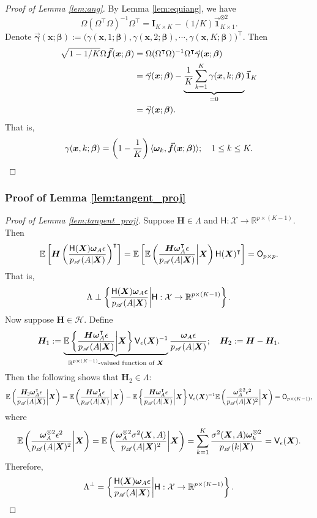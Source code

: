 \documentclass[11pt]{article}
\numberwithin{equation}{section}
\theoremstyle{definition}
\theoremstyle{remark}
\newcommand{\bbf}{\bm{f}}
\newcommand{\bx}{\bm{x}}
\newcommand{\Ib}{\mathbf{I}}
\newcommand{\bH}{\bm{H}}
\newcommand{\bX}{\bm{X}}
\newcommand{\bbeta}{\bm{\beta}}
\newcommand{\bgamma}{\bm{\gamma}}
\newcommand{\bomega}{\bm{\omega}}
\newcommand{\bbE}{\mathbb{E}}
\newcommand{\bbR}{\mathbb{R}}
\newcommand{\cH}{\mathcal{H}}
\newcommand{\cX}{\mathcal{X}}
\newcommand{\sA}{\mathscr{A}}
\newcommand{\sfH}{\mathsf{H}}
\newcommand{\sfO}{\mathsf{O}}
\newcommand{\sfV}{\mathsf{V}}
\newcommand{\bone}{\mathbf{1}}	%
\begin{document}
\begin{proof}[Proof of Lemma \ref{lem:ang}]
	By Lemma \ref{lem:equiang}, we have
	\[ \Omega(\Omega^{\intercal}\Omega)^{-1}\Omega^{\intercal} = \Ib_{K\times K} - (1/K)\vec{\bone}_{K\times 1}^{\otimes 2}. \]
	Denote $ \vec{\bgamma}(\bx;\bbeta) := \big( \gamma(\bx,1;\bbeta),\gamma(\bx,2;\bbeta),\cdots,\gamma(\bx,K;\bbeta) \big)^{\intercal} $. Then
	\begin{align*}
		\sqrt{1 - 1/K}\Omega \vec{\bbf}(\bx;\bbeta) &= \Omega(\Omega^{\intercal}\Omega)^{-1}\Omega^{\intercal}\vec{\bgamma}(\bx;\bbeta)\\
		&= \vec{\bgamma}(\bx;\bbeta) - \underbrace{{1 \over K}\sum_{k=1}^{K}\gamma(\bx,k;\bbeta)}_{= 0}\vec{\bone}_{K}\\
		&= \vec{\bgamma}(\bx;\bbeta).
	\end{align*}
	That is,
	\[ \gamma(\bx,k;\bbeta) = \left( 1 - {1 \over K} \right)\langle \bomega_{k},\vec{\bbf}(\bx;\bbeta) \rangle; \quad 1 \le k \le K. \]
\end{proof}

\subsubsection{Proof of Lemma \ref{lem:tangent_proj}}

\begin{proof}[Proof of Lemma \ref{lem:tangent_proj}]
	Suppose $ \bH \in \Lambda $ and $ \sfH: \cX \to \bbR^{p \times (K-1)} $. Then
	\[ \bbE\left[ \bH\left({\sfH(\bX)\bomega_{A}\epsilon \over p_{\sA}(A|\bX)}\right)^{\intercal} \right] = \bbE\left[ \bbE\left( {\bH\bomega_{A}^{\intercal}\epsilon \over p_{\sA}(A|\bX)} \middle|\bX \right)\sfH(\bX)^{\intercal} \right] = \sfO_{p\times p}. \]
	That is,
	\[ \Lambda \perp \left \{{\sfH(\bX)\bomega_{A}\epsilon \over p_{\sA}(A|\bX)}\middle|\sfH:\cX\to \bbR^{p\times(K-1)} \right \}. \]
	Now suppose $ \bH \in \cH $. Define
	\[ \bH_{1} := \underbrace{\bbE\left\{ {\bH\bomega_{A}^{\intercal}\epsilon \over p_{\sA}(A|\bX)}\middle|\bX \right\}\sfV_{\epsilon}(\bX)^{-1}}_{\text{$ \bbR^{p\times(K-1)} $-valued function of $ \bX $}}{\bomega_{A}\epsilon \over p_{\sA}(A|\bX)}; \quad \bH_{2} := \bH - \bH_{1}. \]
	Then the following shows that $ \bH_{2} \in \Lambda $:
	\[ \bbE\left( {\bH_{2}\bomega_{A}^{\intercal}\epsilon \over p_{\sA}(A|\bX)}\middle|\bX \right) = \bbE\left( {\bH\bomega_{A}^{\intercal}\epsilon \over p_{\sA}(A|\bX)}\middle|\bX \right) - \bbE\left\{ {\bH\bomega_{A}^{\intercal}\epsilon \over p_{\sA}(A|\bX)}\middle|\bX \right\}\sfV_{\epsilon}(\bX)^{-1}\bbE\left( {\bomega_{A}^{\otimes 2}\epsilon^{2} \over p_{\sA}(A|\bX)^{2}}\middle|\bX \right) = \sfO_{p\times(K-1)}, \]
	where
	\[ \bbE\left( {\bomega_{A}^{\otimes 2}\epsilon^{2} \over p_{\sA}(A|\bX)^{2}}\middle|\bX \right) = \bbE\left( {\bomega_{A}^{\otimes 2}\sigma^{2}(\bX,A) \over p_{\sA}(A|\bX)^{2}}\middle|\bX \right) = \sum_{k=1}^{K}{\sigma^{2}(\bX,A)\bomega_{k}^{\otimes 2} \over p_{\sA}(k|\bX)} = \sfV_{\epsilon}(\bX). \]
	Therefore, 
	\[ \Lambda^{\perp} = \left \{{\sfH(\bX)\bomega_{A}\epsilon \over p_{\sA}(A|\bX)}\middle|\sfH:\cX\to \bbR^{p\times(K-1)} \right \}. \]
\end{proof}
\end{document}

